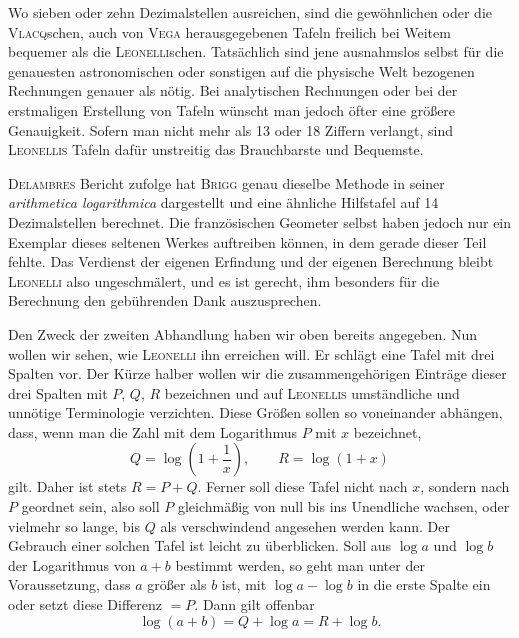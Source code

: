 Wo sieben oder zehn Dezimalstellen ausreichen, sind die gewöhnlichen oder die \textsc{Vlacq}schen, auch von \textsc{Vega} herausgegebenen Tafeln freilich bei Weitem bequemer als die \textsc{Leonelli}schen. Tatsächlich sind jene ausnahmslos selbst für die genauesten astronomischen oder sonstigen auf die physische Welt bezogenen Rechnungen genauer als nötig. Bei analytischen Rechnungen oder bei der erstmaligen Erstellung von Tafeln wünscht man jedoch öfter eine größere Genauigkeit. Sofern man nicht mehr als 13 oder 18 Ziffern verlangt, sind \textsc{Leonellis} Tafeln dafür unstreitig das Brauchbarste und Bequemste.

\textsc{Delambres} Bericht zufolge hat \textsc{Brigg} genau dieselbe Methode in seiner \emph{arithmetica logarithmica} dargestellt und eine ähnliche Hilfstafel auf 14 Dezimalstellen berechnet. Die französischen Geometer selbst haben jedoch nur ein Exemplar dieses seltenen Werkes auftreiben können, in dem gerade dieser Teil fehlte. Das Verdienst der eigenen Erfindung und der eigenen Berechnung bleibt \textsc{Leonelli} also ungeschmälert, und es ist gerecht, ihm besonders für die Berechnung den gebührenden Dank auszusprechen.

Den Zweck der zweiten Abhandlung haben wir oben bereits angegeben. Nun wollen wir sehen, wie \textsc{Leonelli} ihn erreichen will. Er schlägt eine Tafel mit drei Spalten vor. Der Kürze halber wollen wir die zusammengehörigen Einträge dieser drei Spalten mit $P$, $Q$, $R$ bezeichnen und auf \textsc{Leonellis} umständliche und unnötige Terminologie verzichten. Diese Größen sollen so voneinander abhängen, dass, wenn man die Zahl mit dem Logarithmus $P$ mit $x$ bezeichnet,
\[
Q = \log\left(1+\frac{1}{x}\right), \qquad R = \log(1+x)
\]
gilt. Daher ist stets $R = P+Q$. Ferner soll diese Tafel nicht nach $x$, sondern nach $P$ geordnet sein, also soll $P$ gleichmäßig von null bis ins Unendliche wachsen, oder vielmehr so lange, bis $Q$ als verschwindend angesehen werden kann. Der Gebrauch einer solchen Tafel ist leicht zu überblicken. Soll aus $\log a$ und $\log b$ der Logarithmus von $a+b$ bestimmt werden, so geht man unter der Voraussetzung, dass $a$ größer als $b$ ist, mit $\log a - \log b$ in die erste Spalte ein oder setzt diese Differenz $= P$. Dann gilt offenbar
\[
\log(a+b) = Q + \log a = R + \log b.
\]

